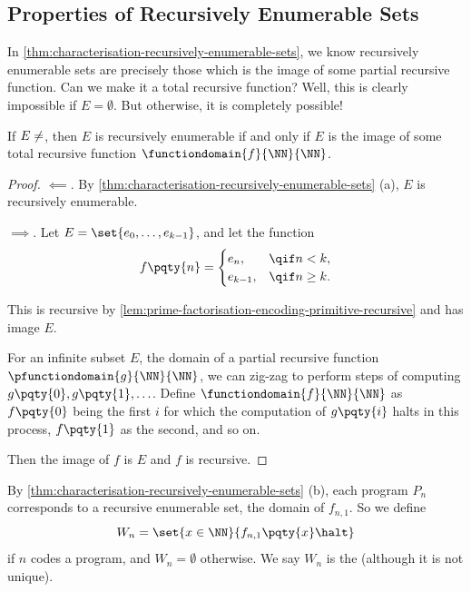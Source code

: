 \subsection{Properties of Recursively Enumerable Sets}

In \autoref{thm:characterisation-recursively-enumerable-sets}, we know recursively enumerable sets are precisely those which is the image of some partial recursive function. Can we make it a total recursive function? Well, this is clearly impossible if \(E = \emptyset\). But otherwise, it is completely possible!

\begin{theorem}
    If \(E \neq \empty\), then \(E\) is recursively enumerable if and only if \(E\) is the image of some total recursive function \(\functiondomain{f}{\NN}{\NN}\).
\end{theorem}

\begin{proof}
    \(\impliedby\). By \autoref{thm:characterisation-recursively-enumerable-sets} (a), \(E\) is recursively enumerable.

    \(\implies\). Let \(E = \set{e_0, \ldots, e_{k - 1}}\), and let the function
    \[
        f\pqty{n} = \begin{cases}
            e_n, & \qif n < k, \\
            e_{k - 1}, & \qif n \geq k.
        \end{cases}
    \]

    This is recursive by \autoref{lem:prime-factorisation-encoding-primitive-recursive} and has image \(E\).

    For an infinite subset \(E\), the domain of a partial recursive function \(\pfunctiondomain{g}{\NN}{\NN}\), we can zig-zag to perform steps of computing \(g\pqty{0}, g\pqty{1}, \ldots\). Define \(\functiondomain{f}{\NN}{\NN}\) as \(f\pqty{0}\) being the first \(i\) for which the computation of \(g\pqty{i}\) halts in this process, \(f\pqty{1}\) as the second, and so on.

    Then the image of \(f\) is \(E\) and \(f\) is recursive.
\end{proof}

By \autoref{thm:characterisation-recursively-enumerable-sets} (b), each program \(P_n\) corresponds to a recursive enumerable set, the domain of \(f_{n, 1}\). So we define
\[
    W_n = \set{x \in \NN}{f_{n, 1}\pqty{x} \halt}
\]
if \(n\) codes a program, and \(W_n = \emptyset\) otherwise. We say \(W_n\) is the  (although it is not unique).

